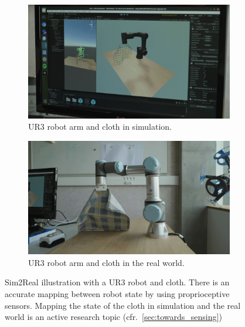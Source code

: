 \documentclass[\home/main.tex]{subfiles}
\begin{document}
\begin{figure}[htpb]{}
    \centering
    \begin{subfigure}[b]{0.90\textwidth}
        \includegraphics[width=\linewidth,keepaspectratio]{figures/sim2real_sim.png}
        \caption{UR3 robot arm and cloth in simulation.}
        \label{fig:towards_sim2real_sim}
    \end{subfigure}

    \par\bigskip 

    \begin{subfigure}[b]{0.90\textwidth}
        \includegraphics[width=\linewidth,keepaspectratio]{figures/sim2real_real.png}
        \caption{UR3 robot arm and cloth in the real world.}
        \label{fig:towards_sim2real_real}
    \end{subfigure}
    \caption[Sim2Real illustration with a UR3 robot and cloth.]{Sim2Real illustration with a UR3 robot and cloth. There is an accurate mapping between robot state by using proprioceptive sensors. Mapping the state of the cloth in simulation and the real world is an active research topic (cfr.\ \cref{sec:towards_sensing})}
    \label{fig:towards_sim2real}
\end{figure}
\end{document}

